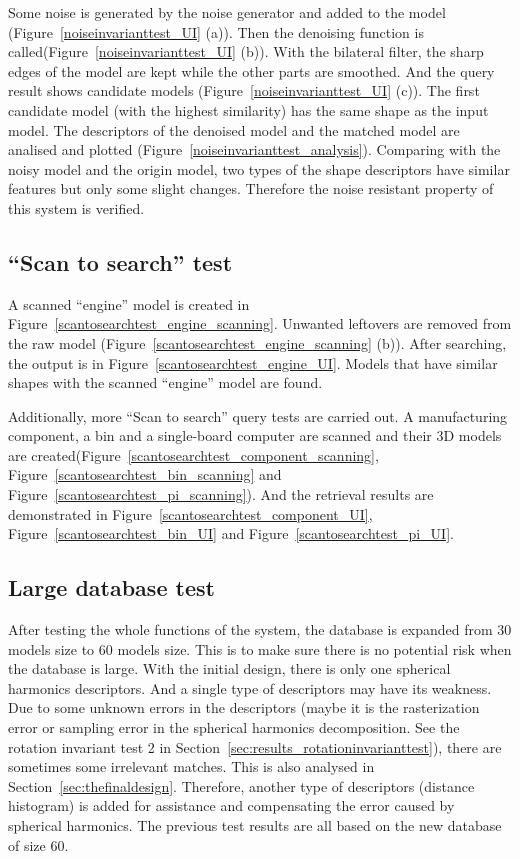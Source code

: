 Some noise is generated by the noise generator and added to the model (Figure~\ref{noiseinvarianttest_UI} (a)). Then the denoising function is called(Figure~\ref{noiseinvarianttest_UI} (b)). With the bilateral filter, the sharp edges of the model are kept while the other parts are smoothed. And the query result shows candidate models (Figure~\ref{noiseinvarianttest_UI} (c)). The first candidate model (with the highest similarity) has the same shape as the input model. The descriptors of the denoised model and the matched model are　analised and plotted (Figure~\ref{noiseinvarianttest_analysis}). Comparing with the noisy model and the origin model, two types of the shape descriptors have similar features but only some slight changes. Therefore the noise resistant property of this system is verified. 

\subsection{``Scan to search'' test}

A scanned ``engine'' model is created in Figure~\ref{scantosearchtest_engine_scanning}. Unwanted leftovers are removed from the raw model (Figure~\ref{scantosearchtest_engine_scanning} (b)). 
After searching, the output is in Figure~\ref{scantosearchtest_engine_UI}. Models that have similar shapes with the scanned ``engine'' model are found. 

Additionally, more ``Scan to search'' query tests are carried out. A manufacturing component, a bin and a single-board computer are scanned and their 3D models are created(Figure~\ref{scantosearchtest_component_scanning}, Figure~\ref{scantosearchtest_bin_scanning} and Figure~\ref{scantosearchtest_pi_scanning}). And the retrieval results are demonstrated in Figure~\ref{scantosearchtest_component_UI}, Figure~\ref{scantosearchtest_bin_UI} and Figure~\ref{scantosearchtest_pi_UI}.

\subsection{Large database test}

After testing the whole functions of the system, the database is expanded from 30 models size to 60 models size. This is to make sure there is no potential risk when the database is large. With the initial design, there is only one spherical harmonics descriptors. And a single type of descriptors may have its weakness. Due to some unknown errors in the descriptors (maybe it is the rasterization error or sampling error in the spherical harmonics decomposition. See the rotation invariant test 2 in Section~\ref{sec:results_rotationinvarianttest}), there are sometimes some irrelevant matches. This is also analysed in Section~\ref{sec:thefinaldesign}.  Therefore, another type of descriptors (distance histogram) is added for assistance and compensating the error caused by spherical harmonics. The previous test results are all based on the new database of size 60. 

